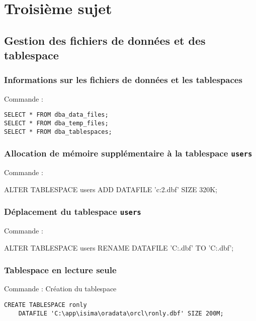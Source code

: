 \section{Troisième sujet}

\subsection{Gestion des fichiers de données et des tablespace}

\subsubsection{Informations sur les fichiers de données et les tablespaces}

Commande :
\begin{verbatim}
SELECT * FROM dba_data_files;
SELECT * FROM dba_temp_files;
SELECT * FROM dba_tablespaces;
\end{verbatim}


\subsubsection{Allocation de mémoire supplémentaire à la tablespace \texttt{users}}

Commande :
\begin{verbatimtab}
ALTER TABLESPACE users ADD DATAFILE 'c:\app\isima\oradata\orcl\users2.dbf' 
	SIZE 320K;
\end{verbatimtab}

\subsubsection{Déplacement du tablespace \texttt{users}}

Commande :
\begin{verbatimtab}
ALTER TABLESPACE users 
	RENAME DATAFILE 'C:\app\isima\oradata\orcl\datafile.dbf' 
	TO 'C:\app\isima\oradata\orcl{}\datafile.dbf';
\end{verbatimtab}


\subsubsection{Tablespace en lecture seule}

Commande : Création du tablespace
\begin{verbatim}
CREATE TABLESPACE ronly
	DATAFILE 'C:\app\isima\oradata\orcl\ronly.dbf' SIZE 200M;
\end{verbatim}


